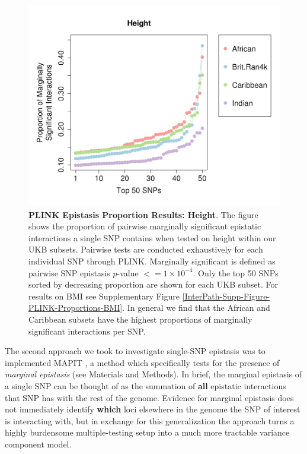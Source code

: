 \documentclass[12pt,a4paper]{article}
\begin{document}
\begin{figure}[htb]
\centering
\includegraphics[scale=.5]{Images/Main/InterPath_Main_Figure_PLINK_vs3_Height.png}
\caption[TBD]{\textbf{PLINK Epistasis Proportion Results: Height}. The figure shows the proportion of pairwise marginally significant epistatic interactions a single SNP contains when tested on height within our UKB subsets. Pairwise tests are conducted exhaustively for each individual SNP through PLINK. Marginally significant is defined as pairwise SNP epistasis $p$-value $<= 1\times10^{-4}$. Only the top 50 SNPs sorted by decreasing proportion are shown for each UKB subset. For results on BMI see Supplementary Figure \ref{InterPath-Supp-Figure-PLINK-Proportions-BMI}. In general we find that the African and Caribbean subsets have the highest proportions of marginally significant interactions per SNP.}
\label{InterPath-Main-Figure-PLINK-Proportions-Height}
\end{figure}

The second approach we took to investigate single-SNP epistasis was to implemented MAPIT \citep{Crawford2017}, a method which specifically tests for the presence of \textit{marginal epistasis} (see Materials and Methods). In brief, the marginal epistasis of a single SNP can be thought of as the summation of \textbf{all} epistatic interactions that SNP has with the rest of the genome. Evidence for marginal epistasis does not immediately identify \textbf{which} loci elsewhere in the genome the SNP of interest is interacting with, but in exchange for this generalization the approach turns a highly burdensome multiple-testing setup into a much more tractable variance component model.
\end{document}
